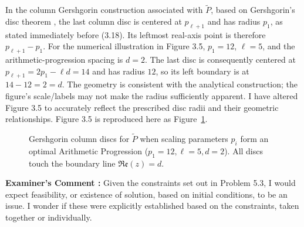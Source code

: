 \documentclass[11pt,a4paper]{article}
\newcounter{examcomment}
\renewcommand{\theexamcomment}{\arabic{examcomment}}
\newcommand{\comment}[1]{%
	\refstepcounter{examcomment}%
	\par\vspace{5pt}\noindent
	\colorbox{gray!13}{%
		\parbox{\dimexpr\linewidth-2\fboxsep}{%
			\textbf{Examiner's Comment \theexamcomment:} #1%
		}%
	}%
	\par
}
\begin{document}
In the column Gershgorin construction associated with $\widetilde P$, based on Gershgorin's disc theorem \cite{horn2012matrix}, the last column disc is centered at $p_{\ell+1}$ and has radius $p_1$, as stated immediately before (3.18). Its leftmost real-axis point is therefore $p_{\ell+1}-p_1$. For the numerical illustration in Figure 3.5, $p_1=12$, $\ell=5$, and the arithmetic-progression spacing is $d=2$. The last disc is consequently centered at $p_{\ell+1}=2p_1-\ell d=14$ and has radius $12$, so its left boundary is at $14-12=2=d$. The geometry is consistent with the analytical construction; the figure's scale/labels may not make the radius sufficiently apparent. I have altered Figure 3.5 to accurately reflect the prescribed disc radii and their geometric relationships.
Figure 3.5 is reproduced here as Figure~\ref{fig:GersgorinDiscInAP}.
\begin{figure}[H]
	\centering
	\caption{Gershgorin column discs for $\tilde{P}$ when scaling parameters $p_i$ form an optimal Arithmetic Progression ($p_1 = 12, \ell = 5, d = 2$). All discs touch the boundary line $\mathfrak{Re}(z) = d$.}
	\label{fig:GersgorinDiscInAP}
\end{figure}


\comment{Given the constraints set out in Problem 5.3, I would expect feasibility, or existence of solution, based on initial conditions, to be an issue. I wonder if these were explicitly established based on the constraints, taken together or individually.}
\end{document}
